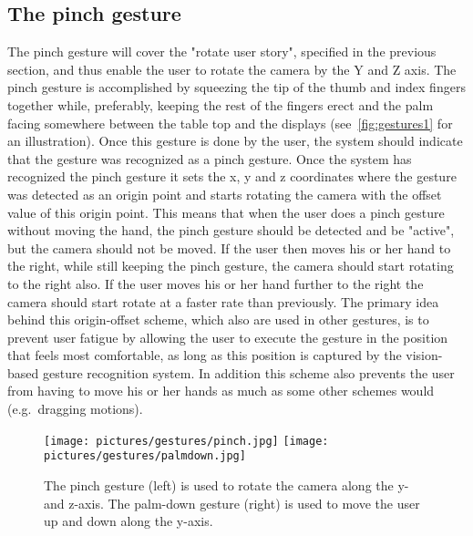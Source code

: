 \subsection{The pinch gesture}
The pinch gesture will cover the "rotate user story", specified in the previous section, and thus enable the user to rotate the camera by the Y and Z axis. 
The pinch gesture is accomplished by squeezing the tip of the thumb and index fingers together while, preferably, keeping the rest of the fingers erect and the palm facing 
somewhere between the table top and the displays (see~\vref{fig:gestures1} for an illustration). Once this gesture is done by the user, 
the system should indicate that the gesture was recognized as a pinch gesture.
Once the system has recognized the pinch gesture it sets the x, y and z coordinates where the gesture was detected as an origin point and starts rotating the 
camera with the offset value of this origin point. This means that when the user does a pinch gesture without moving the hand, the pinch gesture should be detected and be
"active", but the camera should not be moved. If the user then moves his or her hand to the right, while still keeping the pinch gesture, the camera should start rotating 
to the right also. If the user moves his or her hand further to the right the camera should start rotate at a faster rate than previously.  
The primary idea behind this origin-offset scheme, which also are used in other gestures, is to prevent user fatigue by allowing the user to execute
the gesture in the position that feels most comfortable, as long as this position is captured by the vision-based gesture recognition system. 
In addition this scheme also prevents the user from having to move his or her hands as much as some other schemes would (e.g.~dragging motions).  

\begin{figure}%
	\texttt{[image: pictures/gestures/pinch.jpg]}
    \texttt{[image: pictures/gestures/palmdown.jpg]}
	\caption[The pinch and palm-down gestures]{The pinch gesture (left) is used to rotate the camera along the y- and z-axis. 
             The palm-down gesture (right) is used to move the user up and down along the y-axis.}
	\label{fig:gestures1}
\end{figure} 

